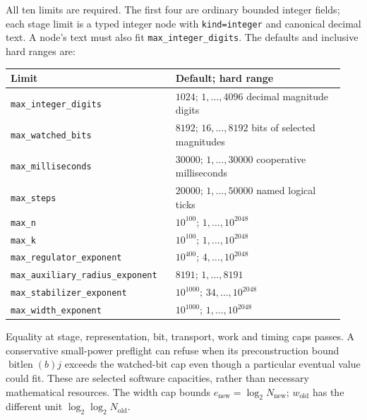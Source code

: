 \documentclass[11pt]{article}
\theoremstyle{plain}
\theoremstyle{definition}
\theoremstyle{remark}
\begin{document}
All ten limits are required. The first four are ordinary bounded integer
fields; each stage limit is a typed integer node with
\texttt{kind=integer} and canonical decimal text. A node's text must also fit
\texttt{max\_integer\_digits}. The defaults and inclusive hard ranges are:
\begingroup
\small
\setlength{\parskip}{0pt}
\begin{longtable}{@{}p{0.46\linewidth}p{0.48\linewidth}@{}}
\toprule
Limit & Default; hard range \\
\midrule
\endhead
\texttt{max\_integer\_digits} & $1024$; $1,\ldots,4096$ decimal magnitude digits \\
\texttt{max\_watched\_bits} & $8192$; $16,\ldots,8192$ bits of selected magnitudes \\
\texttt{max\_milliseconds} & $30000$; $1,\ldots,30000$ cooperative milliseconds \\
\texttt{max\_steps} & $20000$; $1,\ldots,50000$ named logical ticks \\
\texttt{max\_n} & $10^{100}$; $1,\ldots,10^{2048}$ \\
\texttt{max\_k} & $10^{100}$; $1,\ldots,10^{2048}$ \\
\texttt{max\_regulator\_exponent} & $10^{400}$; $4,\ldots,10^{2048}$ \\
\texttt{max\_auxiliary\_radius\_exponent} & $8191$; $1,\ldots,8191$ \\
\texttt{max\_stabilizer\_exponent} & $10^{1000}$; $34,\ldots,10^{2048}$ \\
\texttt{max\_width\_exponent} & $10^{1000}$; $1,\ldots,10^{2048}$ \\
\bottomrule
\end{longtable}
\endgroup
Equality at stage, representation, bit, transport, work and timing caps
passes. A conservative small-power preflight can refuse when its
preconstruction bound $\operatorname{bitlen}(b)j$ exceeds the watched-bit
cap even though a particular eventual value could fit. These are selected
software capacities, rather than necessary mathematical resources.
The width cap bounds $e_{\mathrm{new}}=\log_2N_{\mathrm{new}}$;
$w_{\mathrm{old}}$ has the different unit $\log_2\log_2N_{\mathrm{old}}$.

\end{document}

